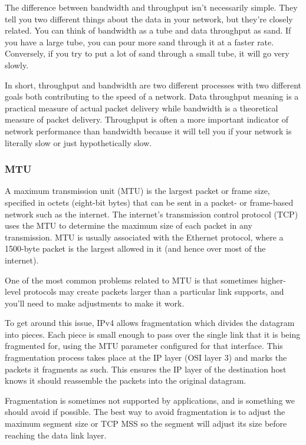 The difference between bandwidth and throughput isn’t necessarily simple. They tell you two different things about the data in your network, but they’re closely related. You can think of bandwidth as a tube and data throughput as sand. If you have a large tube, you can pour more sand through it at a faster rate. Conversely, if you try to put a lot of sand through a small tube, it will go very slowly.

In short, throughput and bandwidth are two different processes with two different goals both contributing to the speed of a network. Data throughput meaning is a practical measure of actual packet delivery while bandwidth is a theoretical measure of packet delivery. Throughput is often a more important indicator of network performance than bandwidth because it will tell you if your network is literally slow or just hypothetically slow.


\subsubsection{MTU}
A maximum transmission unit (MTU) is the largest packet or frame size, specified in octets (eight-bit bytes) that can be sent in a packet- or frame-based network such as the internet. The internet’s transmission control protocol (TCP) uses the MTU to determine the maximum size of each packet in any transmission. MTU is usually associated with the Ethernet protocol, where a 1500-byte packet is the largest allowed in it (and hence over most of the internet).

One of the most common problems related to MTU is that sometimes higher-level protocols may create packets larger than a particular link supports, and you’ll need to make adjustments to make it work.

To get around this issue, IPv4 allows fragmentation which divides the datagram into pieces. Each piece is small enough to pass over the single link that it is being fragmented for, using the MTU parameter configured for that interface. This fragmentation process takes place at the IP layer (OSI layer 3) and marks the packets it fragments as such. This ensures the IP layer of the destination host knows it should reassemble the packets into the original datagram.

Fragmentation is sometimes not supported by applications, and is something we should avoid if possible. The best way to avoid fragmentation is to adjust the maximum segment size or TCP MSS so the segment will adjust its size before reaching the data link layer.


